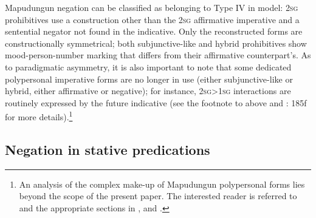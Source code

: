 \documentclass[output=paper,colorlinks,citecolor=brown,draft]{langscibook}
\begin{document}
\begin{table}
    
\end{table}

Mapudungun negation can be classified as belonging to Type IV in  model: \textsc{2sg} prohibitives use a construction other than the \textsc{2sg} affirmative imperative and a sentential negator not found in the indicative. Only the reconstructed forms  are constructionally symmetrical; both subjunctive-like and hybrid prohibitives show mood-person-number marking that differs from their affirmative counterpart’s. As to paradigmatic asymmetry, it is also important to note that some dedicated polypersonal imperative forms are no longer in use (either subjunctive-like or hybrid, either affirmative or negative); for instance, \textsc{2sg>1sg} interactions are routinely expressed by the future indicative (see the footnote to  above and \citealt{Smeets2008}: 185f for more details).\footnote{An analysis of the complex make-up of Mapudungun polypersonal forms lies beyond the scope of the present paper. The interested reader is referred to \citet[Ch. VII]{Zúñiga2006} and the appropriate sections in \citet{Augusta1903}, \citet{Salas2006} and \citet{Smeets2008}.}


\subsection{Negation in stative predications}
\label{sec:mapu:2.3}
\end{document}
